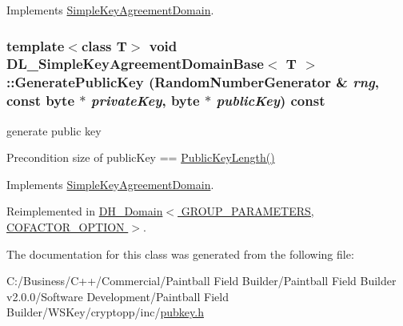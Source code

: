 Implements \hyperlink{class_simple_key_agreement_domain_aee7a4929f8a1a77acd04e12fbcd0a0b1}{SimpleKeyAgreementDomain}.\hypertarget{class_d_l___simple_key_agreement_domain_base_a3e1caeee8c363962a1c766e53f95ef95}{
\subsubsection[{GeneratePublicKey}]{\setlength{\rightskip}{0pt plus 5cm}template$<$class T$>$ void {\bf DL\_\-SimpleKeyAgreementDomainBase}$<$ T $>$::GeneratePublicKey ({\bf RandomNumberGenerator} \& {\em rng}, \/  const byte $\ast$ {\em privateKey}, \/  byte $\ast$ {\em publicKey}) const}}
\label{class_d_l___simple_key_agreement_domain_base_a3e1caeee8c363962a1c766e53f95ef95}


generate public key \begin{DoxyPrecond}{Precondition}
size of publicKey == \hyperlink{class_d_l___simple_key_agreement_domain_base_aeb0120a4c4170c0c6571e6800d92f2fe}{PublicKeyLength()} 
\end{DoxyPrecond}


Implements \hyperlink{class_simple_key_agreement_domain_a56d0957a43c48f3e6431868f564f574f}{SimpleKeyAgreementDomain}.

Reimplemented in \hyperlink{class_d_h___domain_ab1fd61cdab38427665d83a4c37e66083}{DH\_\-Domain$<$ GROUP\_\-PARAMETERS, COFACTOR\_\-OPTION $>$}.

The documentation for this class was generated from the following file:\begin{DoxyCompactItemize}
\item 
C:/Business/C++/Commercial/Paintball Field Builder/Paintball Field Builder v2.0.0/Software Development/Paintball Field Builder/WSKey/cryptopp/inc/\hyperlink{pubkey_8h}{pubkey.h}\end{DoxyCompactItemize}
